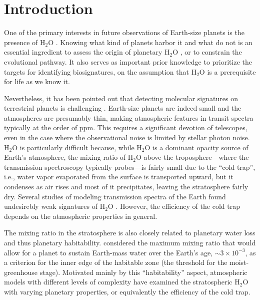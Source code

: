 \documentclass[11pt,numberedappendix,twocolappendix,]{emulateapj}
\def\water{H$_2$O }
\begin{document}

\section{Introduction}
\label{s:intro}

One of the primary interests in future observations of Earth-size planets is the presence of \water. 
Knowing what kind of planets harbor it and what do not is an essential ingredient to assess the origin of planetary \water, or to constrain the evolutional pathway. 
It also serves as important prior knowledge to prioritize the targets for identifying biosignatures, on the assumption that \water is a prerequisite for life as we know it. 

Nevertheless, it has been pointed out that detecting molecular signatures on terrestrial planets is challenging \citep{Cowan2015}. 
Earth-size planets are indeed small and the atmospheres are presumably thin, making atmospheric features in transit spectra typically at the order of ppm. 
This requires a significant devotion of telescopes, even in the case where the observational noise is limited by stellar photon noise. 
\water is particularly difficult because, while \water is a dominant opacity source of Earth's atmosphere, the mixing ratio of \water above the troposphere---where the transmission spectroscopy typically probes---is fairly small due to the ``cold trap'', i.e., water vapor evaporated from the surface is transported upward, but it condenses as air rises and most of it precipitates, leaving the stratosphere fairly dry. 
Several studies of modeling transmission spectra of the Earth found  undesirebly weak signatures of \water \citep[e.g.,][]{Ehrenreich2006, Kaltenegger2009, Betremieux2013, Misra2014}. 
However, the efficiency of the cold trap depends on the atmospheric properties in general. 

The mixing ratio in the stratosphere is also closely related to planetary water loss and thus planetary habitability. 
\citet{Kasting1993} considered the maximum mixing ratio that would allow for a planet to sustain Earth-mass water over the Earth's age, $\sim 3 \times 10^{-3}$, as a criterion for the inner edge of the habitable zone (the threshold for the moist-greenhouse stage). 
Motivated mainly by this ``habitability'' aspect, atmospheric models with different levels of complexity have examined the stratospheric \water with varying planetary properties, or equivalently the efficiency of the cold trap. 
\end{document}
